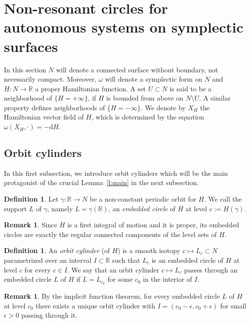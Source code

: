 \documentclass[10pt]{amsart}
\theoremstyle{definition}
\newtheorem{rema}[cdrthm]{Remark}
\newtheorem{defi}[cdrthm]{Definition}
\newcommand{\R}{\mathbb{R}}
\newcommand{\diff}{\mathrm{d}}
\begin{document}
\section{Non-resonant circles for autonomous systems on symplectic surfaces}\label{s:nonresonant}

In this section $N$ will denote a connected surface without boundary, not necessarily compact. Moreover, $\omega$ will denote a symplectic form on $N$ and $H:N\to\R$ a proper Hamiltonian function. A set $U\subset N$ is said to be a neighborhood of $\{H=+\infty\}$, if $H$ is bounded from above on $N\setminus U$. A similar property defines neighborhoods of $\{H=-\infty\}$. We denote by $X_H$ the Hamiltonian vector field of $H$, which is determined by the equation $\omega(X_H,\cdot)=-\diff H$.


\subsection{Orbit cylinders}
In this first subsection, we introduce orbit cylinders which will be the main protagonist of the crucial Lemma~\ref{l:main} in the next subsection.

\begin{defi}
Let $\gamma:\R\to N$ be a non-constant periodic orbit for $H$. We call the support $L$ of $\gamma$, namely $L=\gamma(\R)$, an \emph{embedded circle} of $H$ at level $c:=H(\gamma)$.
\end{defi}

\begin{rema}
Since $H$ is a first integral of motion and it is proper, its embedded circles are exactly the regular connected components of the level sets of $H$.
\end{rema}


\begin{defi}
An \emph{orbit cylinder} (of $H$) is a smooth isotopy $c\mapsto L_c\subset N$ parametrized over an interval $I\subset\R$ such that $L_c$ is an embedded circle of $H$ at level $c$ for every $c\in I$. We say that an orbit cylinder $c\mapsto L_c$ passes through an embedded circle $L$ of $H$ if $L=L_{c_0}$ for some $c_0$ in the interior of $I$.
\end{defi}

\begin{rema}\label{r:imp}
By the implicit function theorem, for every embedded circle $L$ of $H$ at level $c_0$ there exists a unique orbit cylinder with $I=(c_0-\epsilon,c_0+\epsilon)$ for small $\epsilon>0$ passing through it. 
\end{rema}
\end{document}
